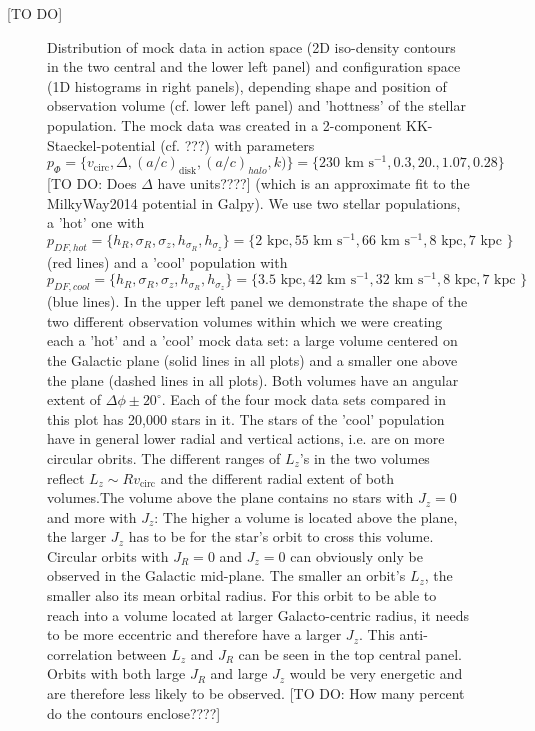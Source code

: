 \documentclass[12pt,preprint]{aastex}
\begin{document}
[TO DO]



\begin{figure}[H]
\caption{Distribution of mock data in action space (2D iso-density contours in the two central and the lower left panel) and configuration space (1D histograms in right panels), depending shape and position of observation volume (cf. lower left panel) and 'hottness' of the stellar population. The mock data was created in a 2-component KK-Staeckel-potential (cf. ???) with parameters $p_\Phi = \{v_\text{circ}, \Delta, (a/c)_\text{disk},(a/c)_{halo},k)\} = \{230\text{ km s$^{-1}$},0.3,20.,1.07, 0.28\}$ [TO DO: Does $\Delta$ have units????] (which is an approximate fit to the MilkyWay2014 potential in Galpy). We use two stellar populations, a 'hot' one with $p_{DF,hot} = \{ h_R, \sigma_R, \sigma_z,h_{\sigma_R},h_{\sigma_z}\} =\{2 \text{ kpc}, 55 \text{ km s$^{-1}$}, 66 \text{ km s$^{-1}$}, 8 \text{ kpc}, 7 \text{ kpc }\} $ (red lines) and a 'cool' population with $p_{DF,cool} = \{ h_R, \sigma_R, \sigma_z,h_{\sigma_R},h_{\sigma_z}\} =\{3.5 \text{ kpc}, 42 \text{ km s$^{-1}$}, 32 \text{ km s$^{-1}$}, 8 \text{ kpc}, 7 \text{ kpc }\} $ (blue lines). In the upper left panel we demonstrate the shape of the two different observation volumes within which we were creating each a 'hot' and a 'cool' mock data set: a large volume centered on the Galactic plane (solid lines in all plots) and a smaller one above the plane (dashed lines in all plots). Both volumes have an angular extent of $\Delta\phi \pm 20^\circ$. Each of the four mock data sets compared in this plot has 20,000 stars in it. The stars of the 'cool' population have in general lower radial and vertical actions, i.e. are on more circular obrits. The different ranges of $L_z$'s in the two volumes reflect $L_z \sim R  v_\text{circ}$ and the different radial extent of both volumes.The volume above the plane contains no stars with $J_z = 0$ and more with $J_z$: The higher a volume is located above the plane, the larger $J_z$ has to be for the star's orbit to cross this volume. Circular orbits with $J_R = 0$ and $J_z = 0$ can obviously only be observed in the Galactic mid-plane. The smaller an orbit's $L_z$, the smaller also its mean orbital radius. For this orbit to be able to reach into a volume located at larger Galacto-centric radius, it needs to be more eccentric and therefore have a larger $J_z$. This anti-correlation between $L_z$ and $J_R$ can be seen in the top central panel. Orbits with both large $J_R$ and large $J_z$ would be very energetic and are therefore less likely to be observed. [TO DO: How many percent do the contours enclose????]} 
\label{fig:mockdatadistr}
\end{figure}
\end{document}
